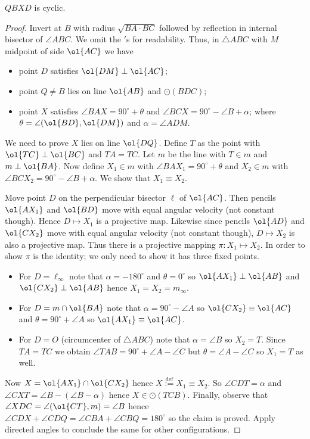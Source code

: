 \begin{claim*}
  $QBXD$ is cyclic.
\end{claim*}
\begin{proof}
Invert at $B$ with radius $\sqrt{BA \cdot BC}$ followed by reflection in internal bisector of $\angle ABC$. We omit the $'$s for readability. Thus, in $\triangle ABC$ with $M$ midpoint of side $\ol{AC}$ we have \begin{itemize}
    \item point $D$ satisfies $\ol{DM} \perp \ol{AC}$;
    \item point $Q \neq B$ lies on line $\ol{AB}$ and $\odot(BDC)$;
    \item point $X$ satisfies $\angle BAX=90^{\circ}+\theta$ and $\angle BCX=90^{\circ}-\angle B+\alpha$; where $\theta=\angle (\ol{BD}, \ol{DM})$ and $\alpha=\angle ADM$.
\end{itemize}

We need to prove $X$ lies on line $\ol{DQ}$. Define $T$ as the point with $\ol{TC} \perp \ol{BC}$ and $TA=TC$. Let $m$ be the line with $T \in m$ and $m \perp \ol{BA}$. Now define $X_1 \in m$ with $\angle BAX_1=90^{\circ}+\theta$ and $X_2 \in m$ with $\angle BCX_2=90^{\circ}-\angle B+\alpha$. We show that  $X_1 \equiv X_2$.

\vspace{0.25cm}


Move point $D$ on the perpendicular bisector $\ell$ of $\ol{AC}$. Then pencils $\ol{AX_1}$ and $\ol{BD}$ move with equal angular velocity (not constant though). Hence $D \mapsto X_1$ is a projective map. Likewise since pencils $\ol{AD}$ and $\ol{CX_2}$ move with equal angular velocity (not constant though), $D \mapsto X_2$ is also a projective map. Thus there is a projective mapping $\pi : X_1 \mapsto X_2$. In order to show $\pi$ is the identity; we only need to show it has three fixed points.

\begin{itemize}
    \item For $D=\ell_{\infty}$ note that $\alpha=-180^{\circ}$ and $\theta=0^{\circ}$ so $\ol{AX_1} \perp \ol{AB}$ and $\ol{CX_2} \perp \ol{AB}$ hence $X_1=X_2=m_{\infty}$.
    \item For $D=m \cap \ol{BA}$ note that $\alpha=90^{\circ}-\angle A$ so $\ol{CX_2} \equiv \ol{AC}$ and $\theta=90^{\circ}+\angle A$ so $\ol{AX_1} \equiv \ol{AC}$.
    \item For $D=O$ (circumcenter of $\triangle ABC$) note that $\alpha=\angle B$ so $X_2=T$. Since $TA=TC$ we obtain $\angle TAB=90^{\circ}+\angle A-\angle C$ but $\theta=\angle A-\angle C$ so $X_1=T$ as well.
\end{itemize}

Now $X=\ol{AX_1} \cap \ol{CX_2}$ hence $X \overset{\text{def}}{:=} X_1 \equiv X_2$. So $\angle CDT=\alpha$ and $\angle CXT=\angle B-(\angle B-\alpha)$ hence $X \in \odot(TCB)$. Finally, observe that $\angle XDC=\angle (\ol{CT}, m)=\angle B$ hence $\angle CDX+\angle CDQ=\angle CBA+\angle CBQ=180^{\circ}$ so the claim is proved. Apply directed angles to conclude the same for other configurations.
\end{proof}


